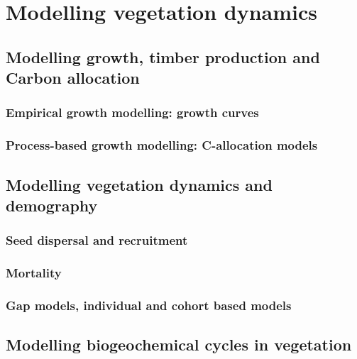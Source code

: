 \documentclass[]{book}
\begin{document}
\part{Modelling vegetation
dynamics}\label{part-modelling-vegetation-dynamics}

\chapter{Modelling growth, timber production and Carbon
allocation}\label{modelling-growth-timber-production-and-carbon-allocation}


\section{Empirical growth modelling: growth
curves}\label{empirical-growth-modelling-growth-curves}

\section{Process-based growth modelling: C-allocation
models}\label{process-based-growth-modelling-c-allocation-models}

\chapter{Modelling vegetation dynamics and
demography}\label{modelling-vegetation-dynamics-and-demography}


\section{Seed dispersal and
recruitment}\label{seed-dispersal-and-recruitment}

\section{Mortality}\label{mortality}

\section{Gap models, individual and cohort based
models}\label{gap-models-individual-and-cohort-based-models}

\chapter{Modelling biogeochemical cycles in
vegetation}\label{modelling-biogeochemical-cycles-in-vegetation}
\end{document}
